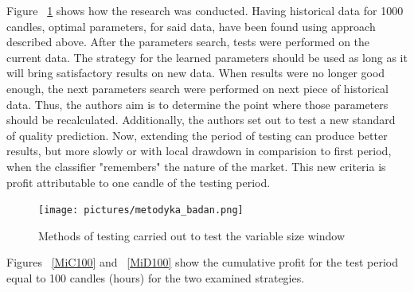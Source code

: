 \documentclass{tewiart}
\begin{document}
Figure ~\ref{research_methods} shows how the research was conducted. Having historical data for 1000 candles, optimal parameters, for said data, have been found using approach described above. After the parameters search, tests were performed on the current data. The strategy for the learned parameters should be used as long as it will bring satisfactory results on new data. When results were no longer good enough, the next parameters search were performed on next piece of historical data. Thus, the authors aim is to determine the point where those parameters should be recalculated. Additionally, the authors set out to test a new standard of quality prediction. Now, extending the period of testing can produce better results, but more slowly or with local drawdown in comparision to first period, when the classifier "remembers" the nature of the market. This new criteria is profit attributable to one candle of the testing period.\\

\begin{figure}[h!]
\begin{center}
\texttt{[image: pictures/metodyka\_badan.png]}
\caption{Methods of testing carried out to test the variable size window}
\label{research_methods}
\end{center}
\end{figure}
\FloatBarrier

Figures ~\ref{MiC100} and ~\ref{MiD100} show the cumulative profit for the test period equal to 100 candles (hours) for the two examined strategies.
\end{document}
